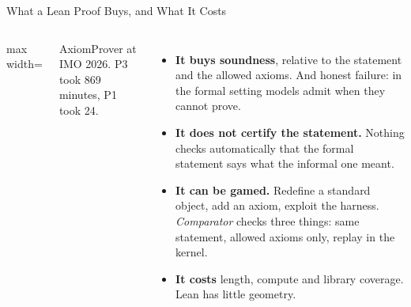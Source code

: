 \begin{frame}{What a Lean Proof Buys, and What It Costs}
    \begin{columns}[T,onlytextwidth]
        \centering
        \begin{adjustbox}{max width=\linewidth}\end{adjustbox}

        {\scriptsize AxiomProver at IMO 2026. P3 took 869 minutes, P1 took 24.}
        \begin{itemize}\itemsep0.4em
            \item \textbf{It buys soundness}, relative to the statement and the allowed axioms. And honest failure: in the formal setting models admit when they cannot prove.
            \item \textbf{It does not certify the statement.} Nothing checks automatically that the formal statement says what the informal one meant.
            \item \textbf{It can be gamed.} Redefine a standard object, add an axiom, exploit the harness. \emph{Comparator} checks three things: same statement, allowed axioms only, replay in the kernel.
            \item \textbf{It costs} length, compute and library coverage. Lean has little geometry.
        \end{itemize}
    \end{columns}
    \vspace{0.1em}
\end{frame}

